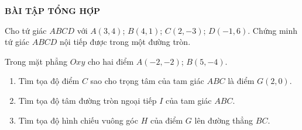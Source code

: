 \begin{center}
	\textbf{BÀI TẬP TỔNG HỢP}
\end{center}
\begin{bt}%
	Cho tứ giác $ABCD$ với $A(3,4)$; $B(4,1)$; $C(2,-3)$; $D(-1,6)$. Chứng minh tứ giác $ABCD$ nội tiếp được trong một đường tròn.
\end{bt}
\begin{bt}%
	Trong mặt phẳng $Oxy$ cho hai điểm $A(-2,-2)$; $B(5,-4)$.
	\begin{enumerate}
		\item Tìm tọa độ điểm $C$ sao cho trọng tâm của tam giác $ABC$ là điểm $G(2,0)$.
		\item Tìm tọa độ tâm đường tròn ngoại tiếp $I$ của tam giác $ABC$.
		\item Tìm tọa độ hình chiếu vuông góc $H$ của điểm $G$ lên đường thẳng $BC$.
	\end{enumerate}
\end{bt}

